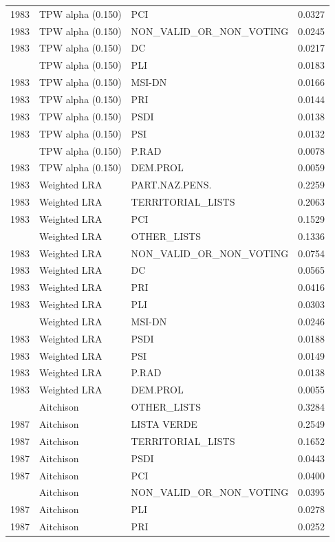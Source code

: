 \begin{longtable}[t]{rllr}
1983 & TPW alpha (0.150) & PCI & 0.0327\\
1983 & TPW alpha (0.150) & NON\_VALID\_OR\_NON\_VOTING & 0.0245\\
1983 & TPW alpha (0.150) & DC & 0.0217\\
\addlinespace
1983 & TPW alpha (0.150) & PLI & 0.0183\\
1983 & TPW alpha (0.150) & MSI-DN & 0.0166\\
1983 & TPW alpha (0.150) & PRI & 0.0144\\
1983 & TPW alpha (0.150) & PSDI & 0.0138\\
1983 & TPW alpha (0.150) & PSI & 0.0132\\
\addlinespace
1983 & TPW alpha (0.150) & P.RAD & 0.0078\\
1983 & TPW alpha (0.150) & DEM.PROL & 0.0059\\
1983 & Weighted LRA & PART.NAZ.PENS. & 0.2259\\
1983 & Weighted LRA & TERRITORIAL\_LISTS & 0.2063\\
1983 & Weighted LRA & PCI & 0.1529\\
\addlinespace
1983 & Weighted LRA & OTHER\_LISTS & 0.1336\\
1983 & Weighted LRA & NON\_VALID\_OR\_NON\_VOTING & 0.0754\\
1983 & Weighted LRA & DC & 0.0565\\
1983 & Weighted LRA & PRI & 0.0416\\
1983 & Weighted LRA & PLI & 0.0303\\
\addlinespace
1983 & Weighted LRA & MSI-DN & 0.0246\\
1983 & Weighted LRA & PSDI & 0.0188\\
1983 & Weighted LRA & PSI & 0.0149\\
1983 & Weighted LRA & P.RAD & 0.0138\\
1983 & Weighted LRA & DEM.PROL & 0.0055\\
\addlinespace
1987 & Aitchison & OTHER\_LISTS & 0.3284\\
1987 & Aitchison & LISTA VERDE & 0.2549\\
1987 & Aitchison & TERRITORIAL\_LISTS & 0.1652\\
1987 & Aitchison & PSDI & 0.0443\\
1987 & Aitchison & PCI & 0.0400\\
\addlinespace
1987 & Aitchison & NON\_VALID\_OR\_NON\_VOTING & 0.0395\\
1987 & Aitchison & PLI & 0.0278\\
1987 & Aitchison & PRI & 0.0252\\

\end{longtable}
